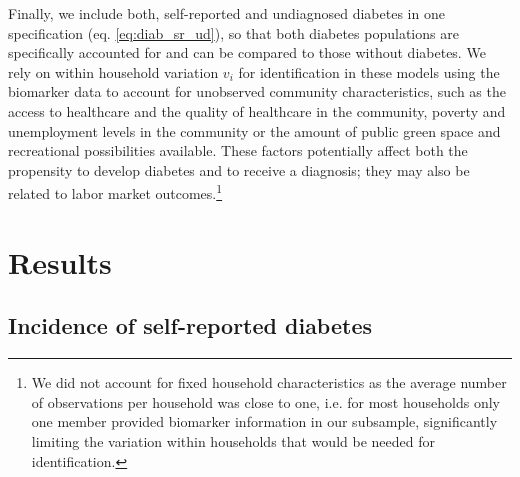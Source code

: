 \documentclass[12pt,english]{article}
\begin{document}
Finally, we include both, self-reported and undiagnosed diabetes in one specification (eq. \ref{eq:diab_sr_ud}), so that both diabetes populations are specifically accounted for and can be compared to those without diabetes. We rely on within household variation $v_{i}$ for identification in these models using the biomarker data to account for unobserved community characteristics, such as the access to healthcare and the quality of healthcare in the community, poverty and unemployment levels in the community or the amount of public green space and recreational possibilities available. These factors potentially affect both the propensity to develop diabetes and to receive a diagnosis; they may also be related to labor market outcomes.\footnote{We did not account for fixed household characteristics as the average number of observations per household was close to one, i.e. for most households only one member provided biomarker information in our subsample, significantly limiting the variation within households that would be needed for identification.}

\section{\label{sec:RESULTS} Results}


\subsection{Incidence of self-reported diabetes}
\end{document}
